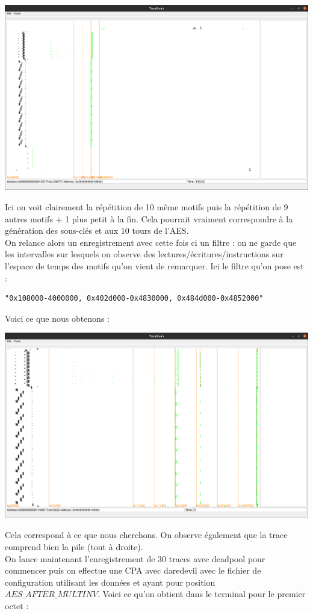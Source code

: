 \documentclass[10pt,a4paper]{article}
\begin{document}
\begin{center}
\includegraphics[scale=0.11]{Images/AES_basique_zoom.png}\\
\end{center}
Ici on voit clairement la répétition de 10 même motifs puis la répétition de 9 autres motifs + 1 plus petit à la fin. Cela pourrait vraiment correspondre à la génération des sous-clés et aux 10 tours de l'AES.\\
On relance alors un enregistrement avec cette fois ci un filtre : on ne garde que les intervalles sur lesquels on observe des lectures/écritures/instructions sur l'espace de temps des motifs qu'on vient de remarquer. Ici le filtre qu'on pose est :

\begin{lstlisting}
"0x108000-4000000, 0x402d000-0x4830000, 0x484d000-0x4852000"
\end{lstlisting}
Voici ce que nous obtenons :

\begin{center}
\includegraphics[scale=0.11]{Images/AES_basique_filtre.png}\\
\end{center}
Cela correspond à ce que nous cherchons. On observe également que la trace comprend bien la pile (tout à droite).\\
On lance maintenant l'enregistrement de 30 traces avec deadpool pour commencer puis on effectue une CPA avec daredevil avec le fichier de configuration utilisant les données et ayant pour position $AES\_AFTER\_MULTINV$.
Voici ce qu'on obtient dans le terminal pour le premier octet :
\end{document}

